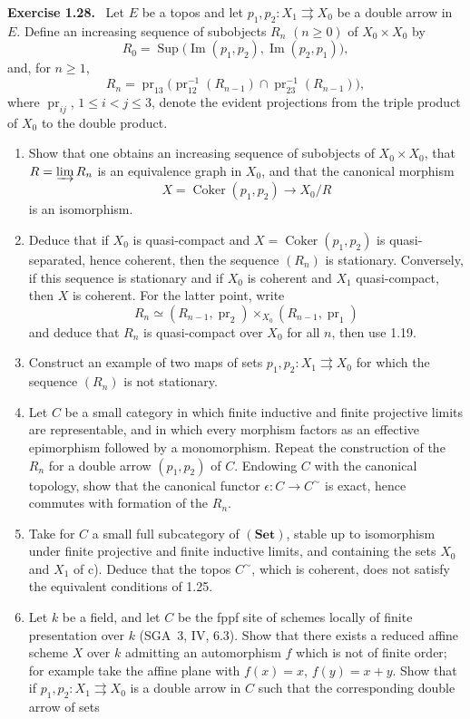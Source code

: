 \documentclass[11pt]{article}
\newcommand{\Set}{\mathbf{Set}}
\newcommand{\Coker}{\operatorname{Coker}}
\newcommand{\Imop}{\operatorname{Im}}
\newcommand{\Sup}{\operatorname{Sup}}
\newcommand{\SGA}{SGA}
\newcommand{\pr}{\operatorname{pr}}
\newenvironment{remarktext}[1]{\par\medskip\noindent\textbf{#1.}\ }{\par\medskip}
\begin{document}
\begin{remarktext}{Exercise 1.28}
Let \(E\) be a topos and let \(p_1,p_2:X_1\rightrightarrows X_0\) be a double arrow in \(E\). Define an increasing sequence of subobjects \(R_n\) \((n\geq0)\) of \(X_0\times X_0\) by
\[
R_0=\Sup\bigl(\Imop(p_1,p_2),\Imop(p_2,p_1)\bigr),
\]
and, for \(n\geq1\),
\[
R_n=\pr_{13}\bigl(\pr_{12}^{-1}(R_{n-1})\cap \pr_{23}^{-1}(R_{n-1})\bigr),
\]
where \(\pr_{ij}\), \(1\leq i<j\leq3\), denote the evident projections from the triple product of \(X_0\) to the double product.
\begin{enumerate}[label=\alph*)]
\item Show that one obtains an increasing sequence of subobjects of \(X_0\times X_0\), that \(R=\varinjlim R_n\) is an equivalence graph in \(X_0\), and that the canonical morphism
\[
X=\Coker(p_1,p_2)\longrightarrow X_0/R
\]
is an isomorphism.
\item Deduce that if \(X_0\) is quasi-compact and \(X=\Coker(p_1,p_2)\) is quasi-separated, hence coherent, then the sequence \((R_n)\) is stationary. Conversely, if this sequence is stationary and if \(X_0\) is coherent and \(X_1\) quasi-compact, then \(X\) is coherent. For the latter point, write
\[
R_n\simeq (R_{n-1},\pr_2)\times_{X_0}(R_{n-1},\pr_1)
\]
and deduce that \(R_n\) is quasi-compact over \(X_0\) for all \(n\), then use 1.19.
\item Construct an example of two maps of sets \(p_1,p_2:X_1\rightrightarrows X_0\) for which the sequence \((R_n)\) is not stationary.
\item Let \(C\) be a small category in which finite inductive and finite projective limits are representable, and in which every morphism factors as an effective epimorphism followed by a monomorphism. Repeat the construction of the \(R_n\) for a double arrow \((p_1,p_2)\) of \(C\). Endowing \(C\) with the canonical topology, show that the canonical functor \(\epsilon:C\to C^\sim\) is exact, hence commutes with formation of the \(R_n\).
\item Take for \(C\) a small full subcategory of \((\Set)\), stable up to isomorphism under finite projective and finite inductive limits, and containing the sets \(X_0\) and \(X_1\) of c). Deduce that the topos \(C^\sim\), which is coherent, does not satisfy the equivalent conditions of 1.25.
\item Let \(k\) be a field, and let \(C\) be the fppf site of schemes locally of finite presentation over \(k\) (\SGA~3, IV, 6.3). Show that there exists a reduced affine scheme \(X\) over \(k\) admitting an automorphism \(f\) which is not of finite order; for example take the affine plane with \(f(x)=x\), \(f(y)=x+y\). Show that if \(p_1,p_2:X_1\rightrightarrows X_0\) is a double arrow in \(C\) such that the corresponding double arrow of sets

\end{enumerate}
\end{remarktext}
\end{document}
